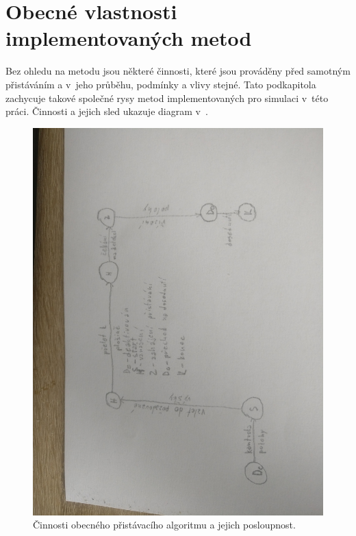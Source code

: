     \section{Obecné vlastnosti implementovaných metod} \label{sec:generalalg}
    Bez ohledu na metodu jsou některé činnosti, které jsou prováděny před samotným přistáváním a v~jeho průběhu, podmínky a vlivy stejné. Tato podkapitola zachycuje takové společné rysy metod implementovaných pro simulaci v~této práci. Činnosti a jejich sled ukazuje diagram v~.
    \begin{figure}
        \centering
        \includegraphics[height=\textwidth,angle=-90,origin=c]{img/algs/genAlg.jpg}
        \caption[Činnosti obecného přistávacího algoritmu]{Činnosti obecného přistávacího algoritmu a jejich posloupnost.}
        \label{fig:algObecny}
    \end{figure}
    
